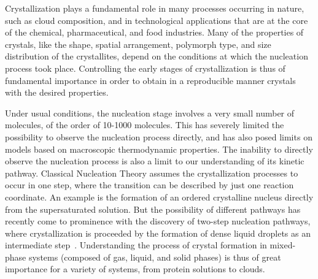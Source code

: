 \documentclass[preprint,amsmath,amssymb,superscriptaddress]{revtex4}
\begin{document}
Crystallization plays a fundamental role in many processes occurring in nature, such as cloud composition, and in technological applications
that are at the core of the chemical, pharmaceutical, and food industries.
Many of the properties of crystals, like the shape, spatial arrangement, polymorph type, and size distribution of the crystallites, depend on the conditions at which
the nucleation process took place. Controlling the early stages of crystallization is thus of fundamental importance in order to
obtain in a reproducible manner crystals with the desired properties. 

Under usual conditions, the nucleation stage involves a very small number of molecules, of the order of 10-1000 molecules.
This has severely limited the possibility to observe the nucleation process directly, and has also posed limits on
models based on macroscopic thermodynamic properties. 
The inability to directly observe the nucleation process is also a limit to our understanding of its kinetic pathway. 
Classical Nucleation Theory assumes the crystallization processes to occur in one step,
where the transition can be described by just one reaction coordinate. An example is the formation of an ordered crystalline nucleus
directly from the supersaturated solution. But the possibility of different pathways has recently come to prominence with
the discovery of two-step nucleation pathways, where crystallization is proceeded by the formation of dense liquid  droplets as an intermediate step~\cite{ten1997enhancement,SearR,savage2009experimental,vekilov2010two,palberg2014crystallization}.
Understanding the process of crystal formation in mixed-phase systems (composed of gas, liquid, and solid phases) is thus
of great importance for a variety of systems, from protein solutions to clouds. 
\end{document}
